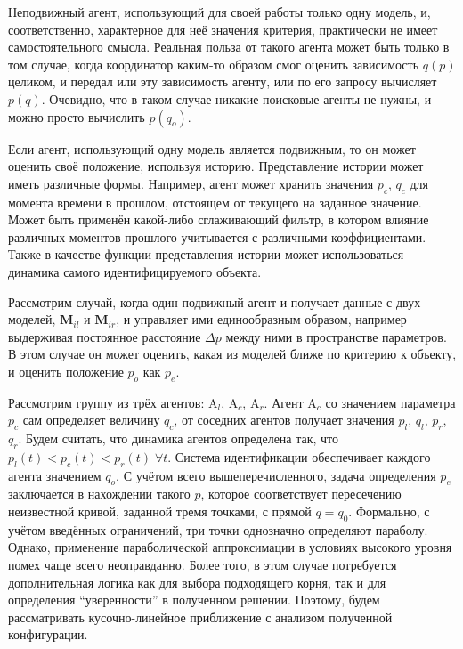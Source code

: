 Неподвижный агент, использующий для своей работы только одну модель,
и, соответственно, характерное для неё значения критерия,
практически не имеет самостоятельного смысла. Реальная польза от такого агента
может быть только в том случае, когда координатор
каким-то образом смог оценить зависимость $q(p)$ целиком,
и передал или эту зависимость агенту, или по его запросу вычисляет $p(q)$.
Очевидно, что в таком случае никакие поисковые агенты не нужны,
и можно просто вычислить $p(q_o)$.

Если агент, использующий одну модель является подвижным,
то он может оценить своё положение, используя историю.
Представление истории может иметь различные формы.
Например, агент может хранить значения $p_c$, $q_c$
для момента времени в прошлом, отстоящем от текущего
на заданное значение. Может быть применён какой-либо
сглаживающий фильтр, в котором влияние различных моментов прошлого учитывается
с различными коэффициентами. Также в качестве функции
представления истории может использоваться
динамика самого идентифицируемого объекта.

Рассмотрим случай, когда один подвижный агент и получает данные с двух моделей,
$ \mathbf{M}_{il}$ и
$ \mathbf{M}_{ir}$,
и управляет ими единообразным образом, например
выдерживая постоянное расстояние $\Delta p$ между ними в пространстве параметров.
В этом случае он может оценить, какая из моделей ближе по критерию
к объекту, и оценить положение $p_o$ как $p_e$.

Рассмотрим группу из трёх агентов:
$\mathrm{A}_l$,
$\mathrm{A}_c$,
$\mathrm{A}_r$.
Агент $\mathrm{A}_c$ со значением параметра $p_c$
сам определяет величину $q_c$,
от соседних агентов получает значения
$p_l$, $q_l$, $p_r$, $q_r$.
Будем считать, что динамика агентов определена так,
что $p_l(t) < p_c(t) < p_r(t) \; \forall t$.
Система идентификации обеспечивает каждого
агента значением $q_o$. С учётом всего вышеперечисленного,
задача определения $p_e$ заключается в нахождении такого $p$,
которое соответствует пересечению неизвестной кривой,
заданной тремя точками, с прямой $q=q_0$.
Формально, с учётом введённых ограничений,
три точки однозначно определяют параболу.
Однако, применение параболической аппроксимации в условиях
высокого уровня помех чаще всего неоправданно. Более того,
в этом случае потребуется дополнительная логика как для
выбора подходящего корня, так и для определения
``уверенности'' в полученном решении. Поэтому, будем рассматривать
кусочно-линейное приближение с анализом полученной конфигурации.

